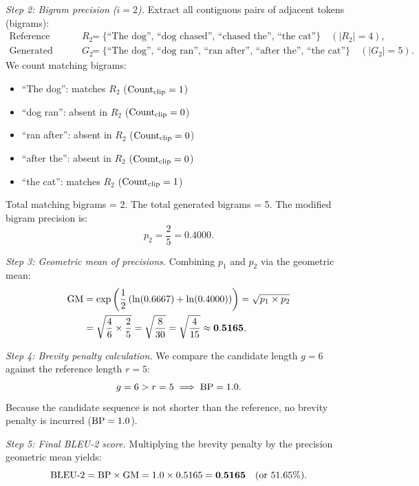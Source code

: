 \documentclass[../../../main.tex]{subfiles}
\begin{document}
\textit{Step 2: Bigram precision ($i = 2$).}
Extract all contiguous pairs of adjacent tokens (bigrams):
\begin{align*}
\text{Reference bigrams } R_2 &= \{\text{``The dog''}, \, \text{``dog chased''}, \, \text{``chased the''}, \, \text{``the cat''}\} \quad (|R_2| = 4), \\
\text{Generated bigrams } G_2 &= \{\text{``The dog''}, \, \text{``dog ran''}, \, \text{``ran after''}, \, \text{``after the''}, \, \text{``the cat''}\} \quad (|G_2| = 5).
\end{align*}
We count matching bigrams:
\begin{itemize}
    \item ``The dog'': matches $R_2$ ($\operatorname{Count}_{\text{clip}} = 1$)
    \item ``dog ran'': absent in $R_2$ ($\operatorname{Count}_{\text{clip}} = 0$)
    \item ``ran after'': absent in $R_2$ ($\operatorname{Count}_{\text{clip}} = 0$)
    \item ``after the'': absent in $R_2$ ($\operatorname{Count}_{\text{clip}} = 0$)
    \item ``the cat'': matches $R_2$ ($\operatorname{Count}_{\text{clip}} = 1$)
\end{itemize}
Total matching bigrams = 2. The total generated bigrams = 5. The modified bigram precision is:
\begin{equation}
p_2 = \frac{2}{5} = \mathbf{0.4000}.
\end{equation}

\textit{Step 3: Geometric mean of precisions.}
Combining $p_1$ and $p_2$ via the geometric mean:
\begin{align}
\mathrm{GM} &= \exp\left( \frac{1}{2}\left( \ln(0.6667) + \ln(0.4000) \right) \right) = \sqrt{p_1 \times p_2} \nonumber \\
    &= \sqrt{\frac{4}{6} \times \frac{2}{5}} = \sqrt{\frac{8}{30}} = \sqrt{\frac{4}{15}} \approx \mathbf{0.5165}.
\end{align}

\textit{Step 4: Brevity penalty calculation.}
We compare the candidate length $g = 6$ against the reference length $r = 5$:
\begin{equation}
g = 6 > r = 5 \implies \mathrm{BP} = 1.0.
\end{equation}
Because the candidate sequence is not shorter than the reference, no brevity penalty is incurred ($\mathrm{BP} = 1.0$).

\textit{Step 5: Final BLEU-2 score.}
Multiplying the brevity penalty by the precision geometric mean yields:
\begin{equation}
\mathrm{BLEU}\text{-}2 = \mathrm{BP} \times \mathrm{GM} = 1.0 \times 0.5165 = \mathbf{0.5165} \quad (\text{or } 51.65\%).
\end{equation}
\end{document}
